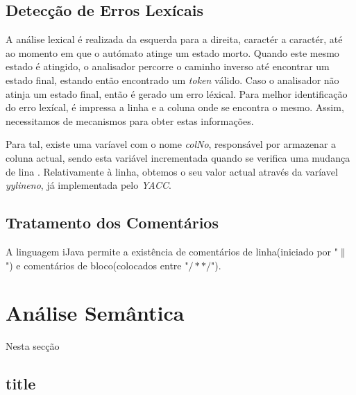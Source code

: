 \documentclass[11pt,a4paper]{article}
\begin{document}
\subsection{Detecção de Erros Lexícais}

A análise lexical é realizada da esquerda para a direita, caractér a caractér, até ao momento em que o autómato atinge um estado morto. Quando este mesmo estado é atingido, o analisador percorre o caminho inverso até encontrar um estado final, estando então encontrado um \emph{token} válido. Caso o analisador não atinja um estado final, então é gerado um erro léxical. Para melhor identificação do erro lexícal, é impressa a linha e a coluna onde se encontra o mesmo. Assim, necessitamos de mecanismos para obter estas informações.

Para tal, existe uma varíavel com o nome \emph{colNo}, responsável por armazenar a coluna actual, sendo esta variável incrementada quando se verifica uma mudança de lina . Relativamente à linha, obtemos o seu valor actual através da varíavel \emph{yylineno}, já implementada pelo \emph{YACC}.



\subsection{Tratamento dos Comentários}

A linguagem iJava permite a existência de comentários de linha(iniciado por "$\|$") e comentários de bloco(colocados entre "$/* */$").

\newpage

\section{Análise Semântica}

Nesta secção 

\subsection{title}
   
\end{document}
